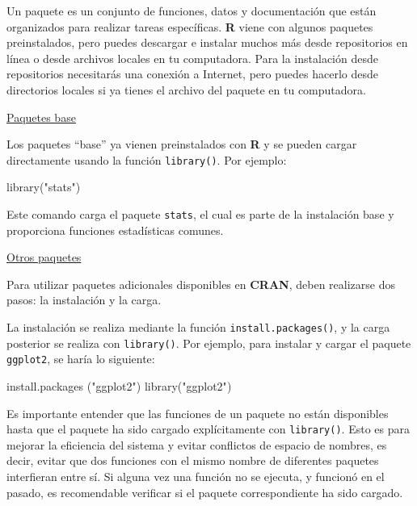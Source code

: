 \documentclass[
  letterpaper,
]{scrbook}
\newenvironment{Shaded}{\begin{snugshade}}{\end{snugshade}}
\newcommand{\FunctionTok}[1]{\textcolor[rgb]{0.28,0.35,0.67}{#1}}
\newcommand{\NormalTok}[1]{\textcolor[rgb]{0.00,0.23,0.31}{#1}}
\newcommand{\StringTok}[1]{\textcolor[rgb]{0.13,0.47,0.30}{#1}}
\begin{document}
Un paquete es un conjunto de funciones, datos y documentación que están
organizados para realizar tareas específicas. \textbf{R} viene con
algunos paquetes preinstalados, pero puedes descargar e instalar muchos
más desde repositorios en línea o desde archivos locales en tu
computadora. Para la instalación desde repositorios necesitarás una
conexión a Internet, pero puedes hacerlo desde directorios locales si ya
tienes el archivo del paquete en tu computadora.

\uline{Paquetes base}

Los paquetes ``base'' ya vienen preinstalados con \textbf{R} y se pueden
cargar directamente usando la función \texttt{library()}. Por ejemplo:

\begin{Shaded}
\begin{Highlighting}[]
\FunctionTok{library}\NormalTok{(}\StringTok{"stats"}\NormalTok{)}
\end{Highlighting}
\end{Shaded}

Este comando carga el paquete \texttt{stats}, el cual es parte de la
instalación base y proporciona funciones estadísticas comunes.

\uline{Otros paquetes}

Para utilizar paquetes adicionales disponibles en \textbf{CRAN}, deben
realizarse dos pasos: la instalación y la carga.

La instalación se realiza mediante la función
\texttt{install.packages()}, y la carga posterior se realiza con
\texttt{library()}. Por ejemplo, para instalar y cargar el paquete
\texttt{ggplot2}, se haría lo siguiente:

\begin{Shaded}
\begin{Highlighting}[]
\FunctionTok{install.packages}\NormalTok{ (}\StringTok{"ggplot2"}\NormalTok{)   }
\FunctionTok{library}\NormalTok{(}\StringTok{"ggplot2"}\NormalTok{)           }
\end{Highlighting}
\end{Shaded}

Es importante entender que las funciones de un paquete no están
disponibles hasta que el paquete ha sido cargado explícitamente con
\texttt{library()}. Esto es para mejorar la eficiencia del sistema y
evitar conflictos de espacio de nombres, es decir, evitar que dos
funciones con el mismo nombre de diferentes paquetes interfieran entre
sí. Si alguna vez una función no se ejecuta, y funcionó en el pasado, es
recomendable verificar si el paquete correspondiente ha sido cargado.
\end{document}
